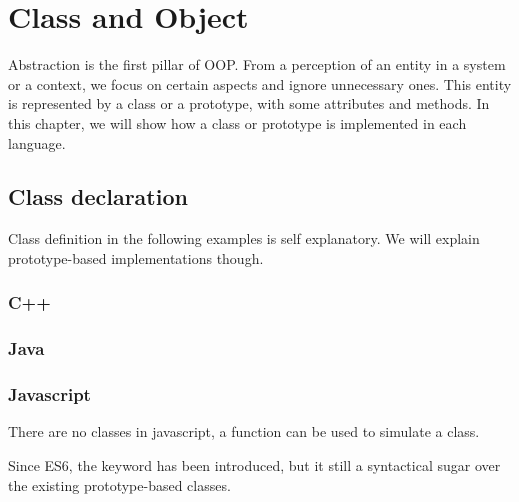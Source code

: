 \documentclass{KodeBook}
\begin{document}
	\chapter{Class and Object}
\fi

\begin{introduction}
	Abstraction is the first pillar of OOP. 
	From a perception of an entity in a system or a context, we focus on certain aspects and ignore unnecessary ones.
	This entity is represented by a class or a prototype, with some attributes and methods.
	In this chapter, we will show how a class  or prototype  is implemented in each language.
\end{introduction}

\section{Class declaration}

Class definition in the following examples is self explanatory. 
We will explain prototype-based implementations though.

\subsection{C++}



\subsection{Java}



\subsection{Javascript}

There are no classes in javascript, a function can be used to simulate a class. 



Since ES6, the  keyword has been introduced, but it still a syntactical sugar over the existing prototype-based classes.


\end{document}
